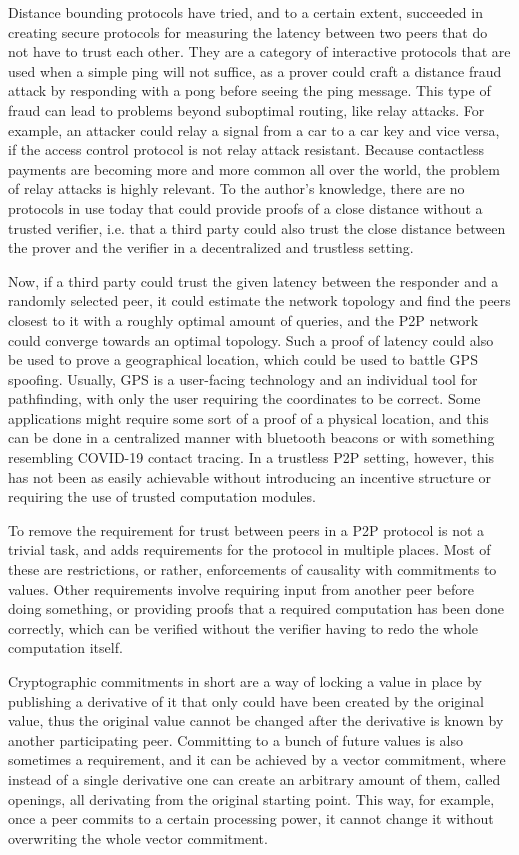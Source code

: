 Distance bounding protocols have tried, and to a certain extent, succeeded in creating secure protocols for measuring the latency between two peers that do not have to trust each other. They are a category of interactive protocols that are used when a simple ping will not suffice, as a prover could craft a distance fraud attack by responding with a pong before seeing the ping message. This type of fraud can lead to problems beyond suboptimal routing, like relay attacks. For example, an attacker could relay a signal from a car to a car key and vice versa, if the access control protocol is not relay attack resistant. Because contactless payments are becoming more and more common all over the world, the problem of relay attacks is highly relevant. To the author's knowledge, there are no protocols in use today that could provide proofs of a close distance without a trusted verifier, i.e. that a third party could also trust the close distance between the prover and the verifier in a decentralized and trustless setting.

Now, if a third party could trust the given latency between the responder and a randomly selected peer, it could estimate the network topology and find the peers closest to it with a roughly optimal amount of queries, and the P2P network could converge towards an optimal topology. Such a proof of latency could also be used to prove a geographical location, which could be used to battle GPS spoofing. Usually, GPS is a user-facing technology and an individual tool for pathfinding, with only the user requiring the coordinates to be correct. Some applications might require some sort of a proof of a physical location, and this can be done in a centralized manner with bluetooth beacons or with something resembling COVID-19 contact tracing. In a trustless P2P setting, however, this has not been as easily achievable without introducing an incentive structure or requiring the use of trusted computation modules.

To remove the requirement for trust between peers in a P2P protocol is not a trivial task, and adds requirements for the protocol in multiple places. Most of these are restrictions, or rather, enforcements of causality with commitments to values. Other requirements involve requiring input from another peer before doing something, or providing proofs that a required computation has been done correctly, which can be verified without the verifier having to redo the whole computation itself.

Cryptographic commitments in short are a way of locking a value in place by publishing a derivative of it that only could have been created by the original value, thus the original value cannot be changed after the derivative is known by another participating peer. Committing to a bunch of future values is also sometimes a requirement, and it can be achieved by a vector commitment, where instead of a single derivative one can create an arbitrary amount of them, called openings, all derivating from the original starting point. This way, for example, once a peer commits to a certain processing power, it cannot change it without overwriting the whole vector commitment.



